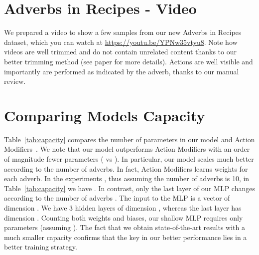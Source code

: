 \documentclass[10pt,twocolumn,letterpaper]{article}
\begin{document}
\section{Adverbs in Recipes - Video}
\label{sec:video}
We prepared a video to show a few samples from our new Adverbs in Recipes dataset, which you can watch at \href{https://youtu.be/YPNw35vtyu8}{https://youtu.be/YPNw35vtyu8}. Note how videos are well trimmed and do not contain unrelated content thanks to our better trimming method (see paper for more details). Actions are well visible and importantly are performed as indicated by the adverb, thanks to our manual review.

\begin{table}[t]
\centering
{}
\caption{Comparing number of parameters in our model and Action Modifiers~\cite{doughty2020action}, calculated for 10 adverbs. Attention parameters calculated with default settings: 4 heads, input features dimension equal to 1024 and Q, K, V dimensions equal to 512.\vspace{-10pt}}
\label{tab:capacity}
\end{table}

\vspace{-5pt}
\section{Comparing Models Capacity}
\label{sec:capacity}

Table~\ref{tab:capacity} compares the number of parameters in our model and Action Modifiers~\cite{doughty2020action}. We note that our model outperforms Action Modifiers with an order of magnitude fewer parameters ( vs ). In particular, our model scales much better according to the number of adverbs. In fact, Action Modifiers learns weights  for each adverb. In the experiments , thus assuming the number of adverbs  is 10, in Table~\ref{tab:capacity} we have . In contrast, only the last layer of our MLP changes according to the number of adverbs . The input to the MLP is a vector of dimension . We have 3 hidden layers of dimension , whereas the last layer has dimension . Counting both weights and biases, our shallow MLP requires only  parameters (assuming ). The fact that we obtain state-of-the-art results with a much smaller capacity confirms that the key in our better performance lies in a better training strategy. 
\end{document}
